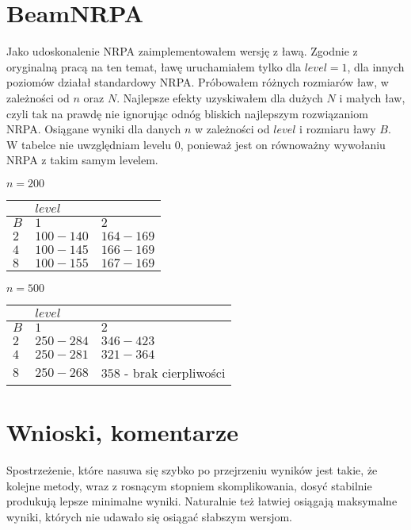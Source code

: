 \documentclass[a4paper,10pt]{article}
\begin{document}
\section{BeamNRPA}
Jako udoskonalenie NRPA zaimplementowałem wersję z ławą. Zgodnie z oryginalną pracą na ten temat, ławę uruchamiałem tylko dla $level=1$,
dla innych poziomów działał standardowy NRPA. Próbowałem różnych rozmiarów ław, w zależności od $n$ oraz $N$. Najlepsze efekty uzyskiwałem
dla dużych $N$ i małych ław, czyli tak na prawdę nie ignorując odnóg bliskich najlepszym rozwiązaniom NRPA. Osiągane wyniki dla danych $n$ w
zależności od $level$ i rozmiaru ławy $B$. W tabelce nie uwzględniam levelu 0, ponieważ jest on równoważny wywołaniu NRPA z takim samym levelem.

$n = 200$

\begin{adjustbox}{center}
\begin{tabularx}{0.7\linewidth}{|X|X|X| }
  \hline
  & \multicolumn{2}{|X|}{$level$} \\
  \hline
  $B$ & $1$ & $2$ \\
  \hline
  $2$ & $100-140$ & $164-169$ \\
  \hline
  $4$ & $100-145$ & $166-169$ \\
  \hline
  $8$ & $100-155$ & $167-169$ \\
  \hline
\end{tabularx}
\end{adjustbox}

\pagebreak
$n = 500$

\begin{adjustbox}{center}
\begin{tabularx}{0.7\linewidth}{|X|X|X| }
  \hline
  & \multicolumn{2}{|X|}{$level$} \\
  \hline
  $B$ & $1$ & $2$ \\
  \hline
  $2$ & $250-284$ & $346 - 423$\\
  \hline
  $4$ & $250-281$ & $321 - 364$  \\
  \hline
  $8$ & $250-268$ & $358$ - brak cierpliwości \\
  \hline
\end{tabularx}
\end{adjustbox}

\section{Wnioski, komentarze}
Spostrzeżenie, które nasuwa się szybko po przejrzeniu wyników jest takie, że kolejne metody, wraz z rosnącym stopniem skomplikowania, dosyć
stabilnie produkują lepsze minimalne wyniki. Naturalnie też łatwiej osiągają maksymalne wyniki, których nie udawało się osiągać słabszym wersjom.
\end{document}
